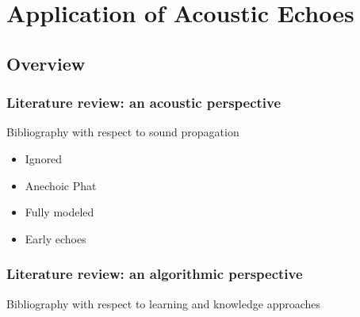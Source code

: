 \chapter{Application of Acoustic Echoes}\label{chap:application}

 \blindtext

\section{Overview}


\subsection{Literature review: an acoustic perspective}
Bibliography with respect to sound propagation
\begin{itemize}
    \item Ignored
    \item Anechoic Phat
    \item Fully modeled
    \item Early echoes
\end{itemize}

\subsection{Literature review: an algorithmic perspective}
Bibliography with respect to learning and knowledge approaches